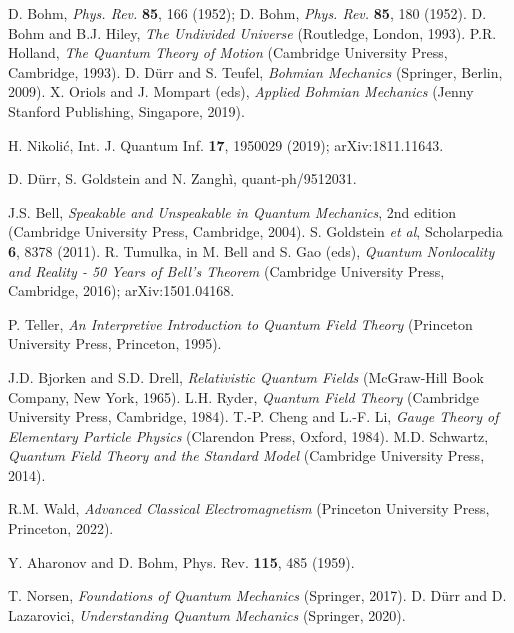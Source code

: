 \documentclass[12pt]{article}
\begin{document}
\begin{thebibliography}{99}

D. Bohm, {\it Phys. Rev.} {\bf 85}, 166 (1952);  
D. Bohm, {\it Phys. Rev.} {\bf 85}, 180 (1952).
D. Bohm and B.J. Hiley, {\it The Undivided Universe} (Routledge, London, 1993).
P.R. Holland, {\it The Quantum Theory of Motion} (Cambridge University Press, Cambridge, 1993).
D. D\"urr and S. Teufel, {\it Bohmian Mechanics} (Springer, Berlin, 2009).
X. Oriols and J. Mompart (eds), {\it Applied Bohmian Mechanics} (Jenny Stanford Publishing, Singapore, 2019).

H. Nikoli\'c, Int. J. Quantum Inf. {\bf 17}, 1950029 (2019); arXiv:1811.11643.

D. D\"urr, S. Goldstein and N. Zangh\`i, quant-ph/9512031.

J.S. Bell, {\it Speakable and Unspeakable in Quantum Mechanics}, 
2nd edition (Cambridge University Press, Cambridge, 2004).
S. Goldstein {\it et al}, Scholarpedia {\bf 6}, 8378 (2011).
R. Tumulka, in M. Bell and S. Gao (eds), 
{\it Quantum Nonlocality and Reality - 50 Years of Bell's Theorem}
(Cambridge University Press, Cambridge, 2016); arXiv:1501.04168.

P. Teller, {\it An Interpretive Introduction to Quantum Field Theory}
(Princeton University Press, Princeton, 1995).

J.D. Bjorken and S.D. Drell, {\it Relativistic Quantum Fields}
(McGraw-Hill Book Company, New York, 1965).
L.H. Ryder, {\it Quantum Field Theory} (Cambridge University Press, Cambridge, 1984).
T.-P. Cheng and L.-F. Li, {\it Gauge Theory of Elementary Particle Physics}
(Clarendon Press, Oxford, 1984).
M.D. Schwartz, {\it Quantum Field Theory and the Standard Model} (Cambridge University Press, 2014).

R.M. Wald, {\it Advanced Classical Electromagnetism} (Princeton University Press, Princeton, 2022).

Y. Aharonov and D. Bohm, Phys. Rev. {\bf 115}, 485 (1959).

T. Norsen, {\it Foundations of Quantum Mechanics} (Springer, 2017).
D. D\"urr and D. Lazarovici, {\it Understanding Quantum Mechanics} (Springer, 2020).


\end{thebibliography}
\end{document}
